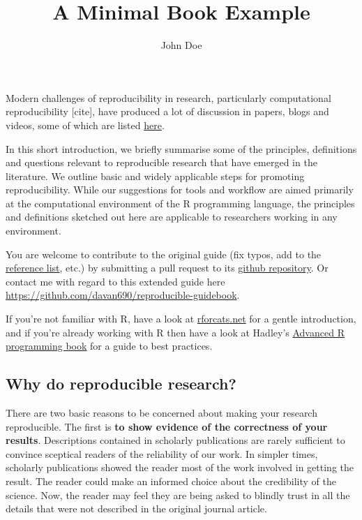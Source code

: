 \documentclass[
]{book}
\title{A Minimal Book Example}
\author{John Doe}
\date{}
\begin{document}
\maketitle

{
\setcounter{tocdepth}{1}
\tableofcontents
}
\hypertarget{section}{%
\chapter{}\label{section}}

Modern challenges of reproducibility in research, particularly computational reproducibility {[}cite{]}, have produced a lot of discussion in papers, blogs and videos, some of which are listed \href{https://github.com/davan690/reproducible-guidebook/blob/main/sections/references/index.md}{here}.

In this short introduction, we briefly summarise some of the principles, definitions and questions relevant to reproducible research that have emerged in the literature. We outline basic and widely applicable steps for promoting reproducibility. While our suggestions for tools and workflow are aimed primarily at the computational environment of the R programming language, the principles and definitions sketched out here are applicable to researchers working in any environment.

You are welcome to contribute to the original guide (fix typos, add to the \href{https://github.com/ropensci/reproducibility-guide/blob/gh-pages/sections/references/index.md}{reference list}, etc.) by submitting a pull request to its \href{https://github.com/ropensci/reproducibility-guide}{github repository}. Or contact me with regard to this extended guide here \url{https://github.com/davan690/reproducible-guidebook}.

If you're not familiar with R, have a look at \href{http://rforcats.net/}{rforcats.net} for a gentle introduction, and if you're already working with R then have a look at Hadley's \href{http://adv-r.had.co.nz/}{Advanced R programming book} for a guide to best practices.

\hypertarget{why-do-reproducible-research}{%
\section{Why do reproducible research?}\label{why-do-reproducible-research}}

There are two basic reasons to be concerned about making your research reproducible. The first is \textbf{to show evidence of the correctness of your results}. Descriptions contained in scholarly publications are rarely sufficient to convince sceptical readers of the reliability of our work. In simpler times, scholarly publications showed the reader most of the work involved in getting the result. The reader could make an informed choice about the credibility of the science. Now, the reader may feel they are being asked to blindly trust in all the details that were not described in the original journal article.
\end{document}
